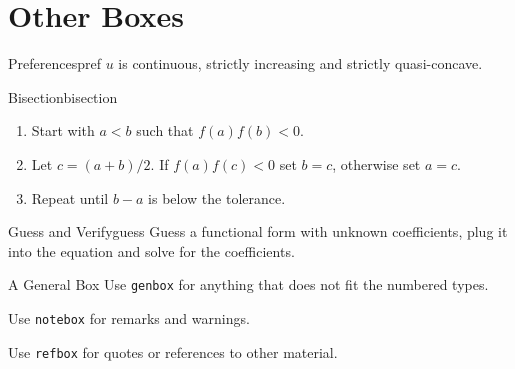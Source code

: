 \section{Other Boxes}
%
\begin{asmpbox}{Preferences}{pref}
$u$ is continuous, strictly increasing and strictly quasi-concave.
\end{asmpbox}
%
\begin{agrbox}{Bisection}{bisection}
\begin{enumerate}
    \item Start with $a<b$ such that $f(a)f(b)<0$.
    \item Let $c=(a+b)/2$. If $f(a)f(c)<0$ set $b=c$, otherwise set $a=c$.
    \item Repeat until $b-a$ is below the tolerance.
\end{enumerate}
\end{agrbox}
%
\begin{tecbox}{Guess and Verify}{guess}
Guess a functional form with unknown coefficients, plug it into the equation and solve for the coefficients.
\end{tecbox}
%
\begin{genbox}{A General Box}
Use \texttt{genbox} for anything that does not fit the numbered types.
\end{genbox}
%
\begin{notebox}
Use \texttt{notebox} for remarks and warnings.
\end{notebox}
%
\begin{refbox}
Use \texttt{refbox} for quotes or references to other material.
\end{refbox}
